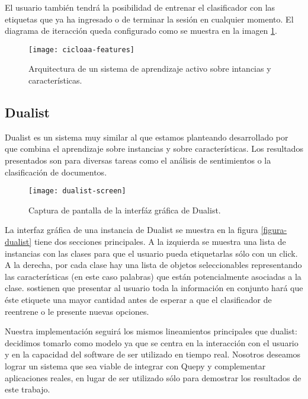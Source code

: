 El usuario también tendrá la posibilidad de entrenar el clasificador con las etiquetas que ya ha ingresado o de terminar la sesión en cualquier momento. El diagrama de iteracción queda configurado como se muestra en la imagen \ref{aa-features}.

\begin{figure}[h!]\label{aa-features}
\caption{Arquitectura de un sistema de aprendizaje activo sobre intancias y características.}
\texttt{[image: cicloaa-features]}
\centering
\end{figure}

\subsection{Dualist}

Dualist es un sistema muy similar al que estamos planteando desarrollado por \citet{dualist} que combina el aprendizaje sobre instancias y sobre características. Los resultados presentados son para diversas tareas como el análisis de sentimientos o la clasificación de documentos.

\begin{figure}[h!]
\caption{Captura de pantalla de la interfáz gráfica de Dualist.}
\texttt{[image: dualist-screen]}
\centering
\end{figure}

La interfaz gráfica de una instancia de Dualist se muestra en la figura \ref{figura-dualist} tiene dos secciones principales. A la izquierda se muestra una lista de instancias con las clases para que el usuario pueda etiquetarlas sólo con un click. A la derecha, por cada clase hay una lista de objetos seleccionables representando las características (en este caso palabras) que están potencialmente asociadas a la clase. \citet{dualist} sostienen que presentar al usuario toda la información en conjunto hará que éste etiquete una mayor cantidad antes de esperar a que el clasificador de reentrene o le presente nuevas opciones.

Nuestra implementación seguirá los mismos lineamientos principales que dualist: decidimos tomarlo como modelo ya que se centra en la interacción con el usuario y en la capacidad del software de ser utilizado en tiempo real. Nosotros deseamos lograr un sistema que sea viable de integrar con Quepy y complementar aplicaciones reales, en lugar de ser utilizado sólo para demostrar los resultados de este trabajo.

